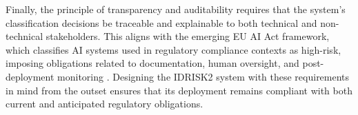 Finally, the principle of transparency and auditability requires that the system's classification decisions be traceable and explainable to both technical and non-technical stakeholders. This aligns with the emerging EU AI Act framework, which classifies AI systems used in regulatory compliance contexts as high-risk, imposing obligations related to documentation, human oversight, and post-deployment monitoring \parencite{tomas_bueno_mom_ilovi__463b771a}. Designing the IDRISK2 system with these requirements in mind from the outset ensures that its deployment remains compliant with both current and anticipated regulatory obligations.
